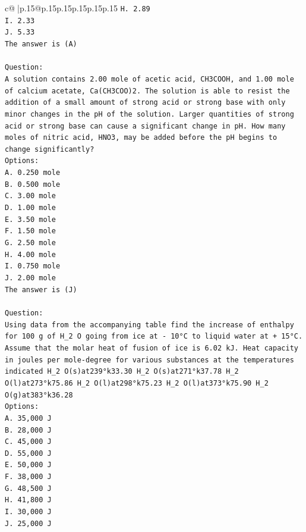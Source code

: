 \documentclass{article}
\begin{document}
{\begin{supertabular}{c@{$\;$}|p{.15\linewidth}@{}p{.15\linewidth}p{.15\linewidth}p{.15\linewidth}p{.15\linewidth}p{.15\linewidth}}
{{{\texttt{H. 2.89} \\
\texttt{I. 2.33} \\
\texttt{J. 5.33} \\
\texttt{The answer is (A)} \\
\\ 
\texttt{Question:} \\
\texttt{A solution contains 2.00 mole of acetic acid, CH3COOH, and 1.00 mole of calcium acetate, Ca(CH3COO)2. The solution is able to resist the addition of a small amount of strong acid or strong base with only minor changes in the pH of the solution. Larger quantities of strong acid or strong base can cause a significant change in pH. How many moles of nitric acid, HNO3, may be added before the pH begins to change significantly?} \\
\texttt{Options:} \\
\texttt{A. 0.250 mole} \\
\texttt{B. 0.500 mole} \\
\texttt{C. 3.00 mole} \\
\texttt{D. 1.00 mole} \\
\texttt{E. 3.50 mole} \\
\texttt{F. 1.50 mole} \\
\texttt{G. 2.50 mole} \\
\texttt{H. 4.00 mole} \\
\texttt{I. 0.750 mole} \\
\texttt{J. 2.00 mole} \\
\texttt{The answer is (J)} \\
\\ 
\texttt{Question:} \\
\texttt{Using data from the accompanying table find the increase of enthalpy for 100 g of H\_2 O going from ice at {-} 10°C to liquid water at + 15°C. Assume that the molar heat of fusion of ice is 6.02 kJ. Heat capacity in joules per mole{-}degree for various substances at the temperatures indicated H\_2 O(s)at239°k33.30 H\_2 O(s)at271°k37.78 H\_2 O(l)at273°k75.86 H\_2 O(l)at298°k75.23 H\_2 O(l)at373°k75.90 H\_2 O(g)at383°k36.28} \\
\texttt{Options:} \\
\texttt{A. 35,000 J} \\
\texttt{B. 28,000 J} \\
\texttt{C. 45,000 J} \\
\texttt{D. 55,000 J} \\
\texttt{E. 50,000 J} \\
\texttt{F. 38,000 J} \\
\texttt{G. 48,500 J} \\
\texttt{H. 41,800 J} \\
\texttt{I. 30,000 J} \\
\texttt{J. 25,000 J} \\
            }
        }
    }
     \\ \\


\end{supertabular}}
\end{document}
